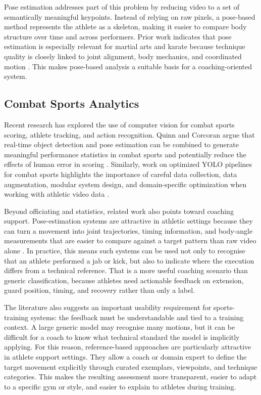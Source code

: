 \documentclass[12pt]{article}
\begin{document}
Pose estimation addresses part of this problem by reducing video to a set of semantically meaningful keypoints. Instead of relying on raw pixels, a pose-based method represents the athlete as a skeleton, making it easier to compare body structure over time and across performers. Prior work indicates that pose estimation is especially relevant for martial arts and karate because technique quality is closely linked to joint alignment, body mechanics, and coordinated motion \cite{echeverria2021pose}. This makes pose-based analysis a suitable basis for a coaching-oriented system.

\subsection{Combat Sports Analytics}
Recent research has explored the use of computer vision for combat sports scoring, athlete tracking, and action recognition. Quinn and Corcoran argue that real-time object detection and pose estimation can be combined to generate meaningful performance statistics in combat sports and potentially reduce the effects of human error in scoring \cite{quinn2024automation}. Similarly, work on optimized YOLO pipelines for combat sports highlights the importance of careful data collection, data augmentation, modular system design, and domain-specific optimization when working with athletic video data \cite{quinn2025yolo}.

Beyond officiating and statistics, related work also points toward coaching support. Pose-estimation systems are attractive in athletic settings because they can turn a movement into joint trajectories, timing information, and body-angle measurements that are easier to compare against a target pattern than raw video alone \cite{echeverria2021pose,wu2024sthka}. In practice, this means such systems can be used not only to recognise that an athlete performed a jab or kick, but also to indicate where the execution differs from a technical reference. That is a more useful coaching scenario than generic classification, because athletes need actionable feedback on extension, guard position, timing, and recovery rather than only a label.

The literature also suggests an important usability requirement for sports-training systems: the feedback must be understandable and tied to a training context. A large generic model may recognise many motions, but it can be difficult for a coach to know what technical standard the model is implicitly applying. For this reason, reference-based approaches are particularly attractive in athlete support settings. They allow a coach or domain expert to define the target movement explicitly through curated exemplars, viewpoints, and technique categories. This makes the resulting assessment more transparent, easier to adapt to a specific gym or style, and easier to explain to athletes during training.
\end{document}
